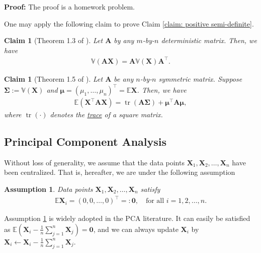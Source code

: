 \documentclass[11pt,letterpaper, leqno]{article}
\newtheorem{claim}[theorem]{Claim}
\numberwithin{equation}{section}
\numberwithin{theorem}{section}
\numberwithin{lemma}{section}
\numberwithin{corollary}{section}
\numberwithin{definition}{section}
\numberwithin{proposition}{section}
\numberwithin{remark}{section}
\numberwithin{example}{section}
\newtheorem{assumption}{Assumption}
\newcommand{\T}{\intercal}
\begin{document}
\textbf{Proof:} The proof is a homework problem.

\noindent One may apply the following claim to prove Claim \ref{claim: positive semi-definite}.
\begin{claim}[Theorem 1.3 of \cite{seber2012linear}]\label{claim: covariance of AX}
    Let $\boldsymbol{A}$ by any $m$-by-$n$ deterministic  matrix. Then, we have
    \begin{align*}
        \mathbb{V}(\boldsymbol{AX}) = \boldsymbol{A}\mathbb{V}(\boldsymbol{X})\boldsymbol{A}^\T.
    \end{align*}
\end{claim}
\begin{claim}[Theorem 1.5 of \cite{seber2012linear}]\label{claim: expected values of quadratic forms}
    Let $\boldsymbol{A}$ be any $n$-by-$n$ symmetric matrix. Suppose $\boldsymbol{\Sigma}:=\mathbb{V}(\boldsymbol{X})$ and $\boldsymbol{\mu}=(\mu_1,\ldots,\mu_n)^\T=\mathbb{E}\boldsymbol{X}$. Then, we have
    \begin{align}
        \mathbb{E}(\boldsymbol{X}^\T\boldsymbol{A}\boldsymbol{X}) = \operatorname{tr}(\boldsymbol{A \Sigma})+\boldsymbol{\mu}^\T \boldsymbol{A} \boldsymbol{\mu},
    \end{align}
    where $\operatorname{tr}(\cdot)$ denotes the \href{https://en.wikipedia.org/wiki/Trace_(linear_algebra)}{trace} of a square matrix.
\end{claim}



\subsection{Principal Component Analysis}

Without loss of generality, we assume that the data points $\boldsymbol{X}_1, \boldsymbol{X}_2, \ldots, \boldsymbol{X}_n$ have been centralized. That is, hereafter, we are under the following assumption
\begin{assumption}\label{assumption: centralization}
    Data points $\boldsymbol{X}_1, \boldsymbol{X}_2, \ldots, \boldsymbol{X}_n$ satisfy 
    \begin{align}\label{eq: centralization}
    \mathbb{E}\boldsymbol{X}_i=(0,0,\ldots,0)^\T=:\boldsymbol{0}, \ \ \ \text{ for all }i=1,2,\ldots,n.
\end{align}
\end{assumption}
\noindent Assumption \ref{assumption: centralization} is widely adopted in the PCA literature. It can easily be satisfied as $\mathbb{E}(\boldsymbol{X}_i - \frac{1}{n}\sum_{j=1}^n \boldsymbol{X}_j)=\boldsymbol{0}$, and we can always update $\boldsymbol{X}_i$ by $\boldsymbol{X}_i \leftarrow \boldsymbol{X}_i - \frac{1}{n}\sum_{j=1}^n \boldsymbol{X}_j$. 
\end{document}
